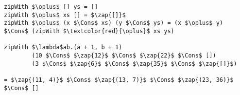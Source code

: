 \begin{frame}[fragile]


\begin{lstlisting}[mathescape=true,numbers=none]
zipWith $\oplus$ [] ys = []
zipWith $\oplus$ xs [] = $\zap{[]}$
zipWith $\oplus$ (x $\Cons$ xs) (y $\Cons$ ys) = (x $\oplus$ y) $\Cons$ (zipWith $\textcolor{red}{\oplus}$ xs ys)

zipWith $\lambda$ab.(a + 1, b + 1)
        (10 $\Cons$ $\zap{12}$ $\Cons$ $\zap{22}$ $\Cons$ [])
        (3 $\Cons$ $\zap{6}$ $\Cons$ $\zap{35}$ $\Cons$ $\zap{[]}$)

= $\zap{(11, 4)}$ $\Cons$ $\zap{(13, 7)}$ $\Cons$ $\zap{(23, 36)}$ $\Cons$ []
\end{lstlisting}

\end{frame}
